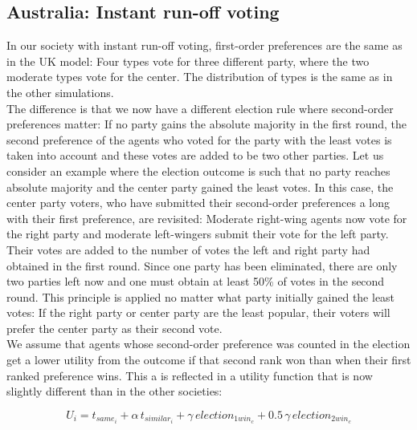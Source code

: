 \documentclass[12pt, a4paper]{article}
\begin{document}
\subsection{Australia: Instant run-off voting} 
In our society with instant run-off voting, first-order preferences are the same as in the UK model: Four types vote for three different party, where the two moderate types vote for the center. The distribution of types is the same as in the other simulations. \\
The difference is that we now have a different election rule where second-order preferences matter: If no party gains the absolute majority in the first round, the second preference of the agents who voted for the party with the least votes is taken into account and these votes are added to be two other parties. Let us consider an example where the election outcome is such that no party reaches absolute majority and the center party gained the least votes. In this case, the center party voters, who have submitted their second-order preferences a long with their first preference, are revisited: Moderate right-wing agents now vote for the right party and moderate left-wingers submit their vote for the left party. Their votes are added to the number of votes the left and right party had obtained in the first round. Since one party has been eliminated, there are only two parties left now and one must obtain at least 50\% of votes in the second round. This principle is applied no matter what party initially gained the least votes: If the right party or center party are the least popular, their voters will prefer the center party as their second vote. \\
We assume that agents whose second-order preference was counted in the election get a lower utility from the outcome if that second rank won than when their first ranked preference wins. This a is reflected in a utility function that is now slightly different than in the other societies: %

\begin{equation}
U_i=t_{same_i}+\alpha \, t_{similar_i}+\gamma \, election_{1win_c} + 0.5 \, \gamma \, election_{2win_c}
\end{equation}
\end{document}
